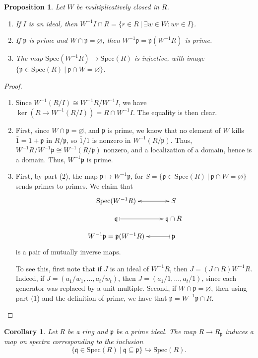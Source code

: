 \documentclass{amsart}[12pt]
\def\ker{\operatorname{ker}}
\newcommand{\p}{{\mathfrak p}}
\newcommand{\q}{{\mathfrak q}}
\numberwithin{equation}{section}
\theoremstyle{plain} %
\newtheorem{corollary}[equation]{Corollary}
\newtheorem{proposition}[equation]{Proposition}
\theoremstyle{definition}
\theoremstyle{remark}
\newcommand{\Spec}{\mathrm{Spec}}
\begin{document}
\begin{proposition}
	Let $W$ be multiplicatively closed in $R$.
	\begin{enumerate}
		\item If $I$ is an ideal, then $W^{-1} I \cap R = \{ r \in R \ | \ \exists w\in W : wr\in I\}$.
		\item If $\p$ is prime and $W \cap \p=\varnothing$, then $W^{-1}\p =\p (W^{-1}R)$ is prime.
		\item The map $\Spec(W^{-1} R) \to \Spec(R)$ is injective, with image $\{\p \in \Spec(R) \ | \ \p \cap W = \varnothing\}$.
	\end{enumerate}

\end{proposition}
\begin{proof}
	\begin{enumerate}
		\item Since $W^{-1}(R/I) \cong W^{-1} R / W^{-1} I$, we have $\ker (R \to W^{-1}(R/I)) = R \cap W^{-1} I$. The equality is then clear.
		\item First, since $W\cap \p =\varnothing$, and $\p$ is prime, we know that no element of $W$ kills $\bar{1}=1 + \p$ in $R/\p$, so $\bar{1}/1$ is nonzero in $W^{-1}(R/\p)$. Thus, $W^{-1}R / W^{-1}\p \cong W^{-1}(R/\p)$ nonzero, and a localization of a domain, hence is a domain. Thus, $W^{-1}\p$ is prime.
		\item First, by part (2), the map $\p \mapsto W^{-1}\p$, for $S=\{\p \in \Spec(R) \ | \ \p \cap W = \varnothing\}$ sends primes to primes. We claim that 
	\[\xymatrix@R=1em{  \Spec(W^{-1} R) \ar@{<->}[r] & S \\
	\q  \ar@{|->}[r] &  \q \cap R \\
	W^{-1}\p=\p (W^{-1}R) \ar@{<-|}[r] & \p}\]
		is a pair of mutually inverse maps.
		
	To see this, first note that if $J$ is an ideal of $W^{-1}R$, then $J=(J\cap R) W^{-1}R$. Indeed, if $J=(a_1/w_1,\dots,a_t/w_t)$, then  $J=(a_1/1,\dots,a_t/1)$, since each generator was replaced by a unit multiple. Second, if $W\cap \p=\varnothing$, then using part (1) and the definition of prime, we have that $\p = W^{-1}\p \cap R$.\qedhere
	\end{enumerate}
\end{proof}

\begin{corollary}
Let $R$ be a ring and $\p$ be a prime ideal. The map $R\to R_{\p}$ induces a map on spectra corresponding to the inclusion
\[ \{ \q \in \Spec(R) \ | \ \q \subseteq \p \} \hookrightarrow \Spec(R).\]
\end{corollary}
\end{document}

